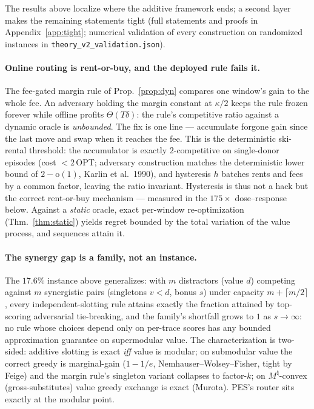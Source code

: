 \documentclass[10pt,twocolumn]{article}
\theoremstyle{definition}
\begin{document}
The results above localize where the additive framework ends; a second layer makes the
remaining statements tight (full statements and proofs in Appendix~\ref{app:tight};
numerical validation of every construction on randomized instances in
\texttt{theory\_v2\_validation.json}).

\paragraph{Online routing is rent-or-buy, and the deployed rule fails it.}
The fee-gated margin rule of Prop.~\ref{prop:dyn} compares one window's gain to the whole
fee. An adversary holding the margin constant at $\kappa/2$ keeps the rule frozen forever
while offline profits $\Theta(T\delta)$: the rule's competitive ratio against a dynamic
oracle is \emph{unbounded}. The fix is one line --- accumulate forgone gain since the last
move and swap when it reaches the fee. This is the deterministic ski-rental threshold: the
accumulator is exactly $2$-competitive on single-donor episodes (cost $<2\,$OPT; adversary
construction matches the deterministic lower bound of $2-\mathrm{o}(1)$, Karlin et al.\
1990), and hysteresis $h$ batches rents and fees by a common factor, leaving the ratio
invariant. Hysteresis is thus not a hack but the correct rent-or-buy mechanism --- measured
in the $175\times$ dose--response below. Against a \emph{static} oracle, exact per-window
re-optimization (Thm.~\ref{thm:static}) yields regret bounded by the total variation of the
value process, and sequences attain it.

\paragraph{The synergy gap is a family, not an instance.}
The $17.6\%$ instance above generalizes: with $m$ distractors (value $d$) competing against
$m$ synergistic pairs (singletons $v<d$, bonus $s$) under capacity $m+\lceil m/2\rceil$,
every independent-slotting rule attains exactly the fraction attained by top-scoring
adversarial tie-breaking, and the family's shortfall grows to $1$ as $s\to\infty$: no
rule whose choices depend only on per-trace scores has any bounded approximation guarantee
on supermodular value. The characterization is two-sided: additive slotting is exact
\emph{iff} value is modular; on submodular value the correct greedy is marginal-gain
($1-1/e$, Nemhauser--Wolsey--Fisher, tight by Feige) and the margin rule's singleton variant
collapses to factor-$k$; on $M^{\natural}$-convex (gross-substitutes) value greedy exchange
is exact (Murota). PES's router sits exactly at the modular point.
\end{document}
